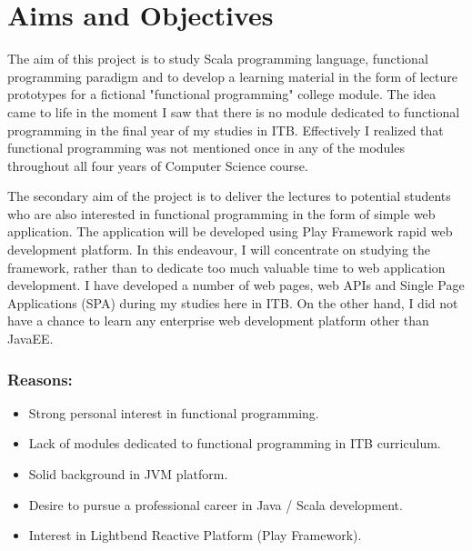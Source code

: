 \documentclass[12pt,twoside,a4paper]{report}
\begin{document}
\section{Aims and Objectives}\label{1.2}
The aim of this project is to study Scala programming language, functional programming paradigm and to develop a learning material in the form of lecture prototypes for a fictional "functional programming" college module. The idea came to life in the moment I saw that there is no module dedicated to functional programming in the final year of my studies in ITB. Effectively I realized that functional programming was not mentioned once in any of the modules throughout all four years of Computer Science course.

The secondary aim of the project is to deliver the lectures to potential students who are also interested in functional programming in the form of simple web application. The application will be developed using Play Framework rapid web development platform. In this endeavour, I will concentrate on studying the framework, rather than to dedicate too much valuable time to web application development. I have developed a number of web pages, web APIs and Single Page Applications (SPA) during my studies here in ITB. On the other hand, I did not have a chance to learn any enterprise web development platform other than JavaEE.

\subsubsection{Reasons:}

\begin{itemize}\itemsep1pt \parskip0pt 
\item Strong personal interest in functional programming.
\item Lack of modules dedicated to functional programming in ITB curriculum.
\item Solid background in JVM platform.
\item Desire to pursue a professional career in Java / Scala development.
\item Interest in Lightbend Reactive Platform\cite{32} (Play Framework).
\end{itemize}
\end{document}
